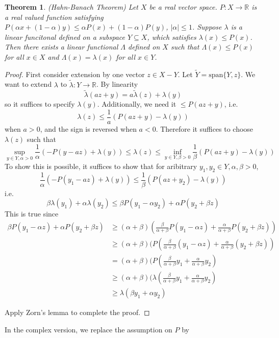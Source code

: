 \documentclass[12pt]{article}
\theoremstyle{plain}
\newtheorem{theorem}[equation]{Theorem}
\theoremstyle{definition}
\theoremstyle{named}
\newcommand{\<}{\langle}
\renewcommand{\>}{\rangle}
\def\wt{\widetilde}
\newcommand{\IR}{\mathbb{R}}
\begin{document}
\begin{theorem}
\emph{(Hahn-Banach Theorem)}
Let $X$ be a real vector space. $P : X \to \IR$ is a real valued function satisfying $P(\alpha x + (1 - \alpha) y) \le \alpha P(x) + (1 - \alpha) P(y)$, $|\alpha| \le 1$. Suppose $\lambda$ is a linear funcitonal defined on a subspace $Y \subseteq X$, which satisfies $\lambda(x) \le P(x)$. Then there exists a linear functional $\Lambda$ defined on $X$ such that $\Lambda(x) \le P(x)$ for all $x \in X$ and $\Lambda(x) = \lambda(x)$ for all $x \in Y$. 
\end{theorem}
\begin{proof}
First consider extension by one vector $z \in X - Y$. Let $\wt{Y} = \mathrm{span} \{ Y, z \}$. We want to extend $\lambda$ to $\wt{\lambda} : Y \to \IR$. By linearity
$$ \wt{\lambda}(a z + y) = a \wt{\lambda}(z) + \lambda(y) $$
so it suffices to specify $\lambda(y)$. Additionally, we need it $\le P(az + y)$, i.e. 
$$ \lambda(z) \le \frac{1}{a} (P(az + y) - \lambda(y))$$
when $a > 0$, and the sign is reversed when $a < 0$. Therefore it suffices to choose $\lambda(z)$ such that 
$$ \sup_{y \in Y, \alpha > 0} \frac{1}{\alpha}(-P(y - az) + \lambda(y)) \le \lambda(z) \le \inf_{y \in Y, \beta > 0}\frac{1}{\beta}(P(az + y) - \lambda(y))$$
To show this is possible, it suffices to show that for aribitrary $y_1, y_2 \in Y, \alpha, \beta > 0$, 
$$ \frac{1}{\alpha}(-P(y_1 - az) + \lambda(y)) \le \frac{1}{\beta}(P(az + y_2) - \lambda(y)) $$i.e. 
$$ \beta \lambda(y_1) + \alpha \lambda(y_2) \le \beta P(y_1 - \alpha y_2) + \alpha P(y_2 + \beta z) $$
This is true since 
\begin{align*}
\beta P(y_1  - \alpha z ) + \alpha P(y_2 + \beta z) & \ge (\alpha + \beta)(\frac{\beta}{\alpha + \beta} P(y_1 - \alpha z) + \frac{\alpha}{\alpha + \beta} P(y_2 + \beta z)) \\
&\ge (\alpha + \beta)(P(\frac{\beta}{\alpha + \beta} (y_1 - \alpha z) +  \frac{\alpha}{\alpha + \beta} (y_2 + \beta z)) \\
&= (\alpha + \beta)(P(\frac{\beta}{\alpha + \beta} y_1 +  \frac{\alpha}{\alpha + \beta} y_2) \\
&\ge (\alpha + \beta)(\lambda(\frac{\beta}{\alpha + \beta} y_1 +  \frac{\alpha}{\alpha + \beta} y_2) \\
&\ge \lambda(\beta y_1 + \alpha y_2) 
\end{align*}


Apply Zorn's lemma to complete the proof. 
\end{proof}
In the complex version, we replace the assumption on $P$ by 
\end{document}
